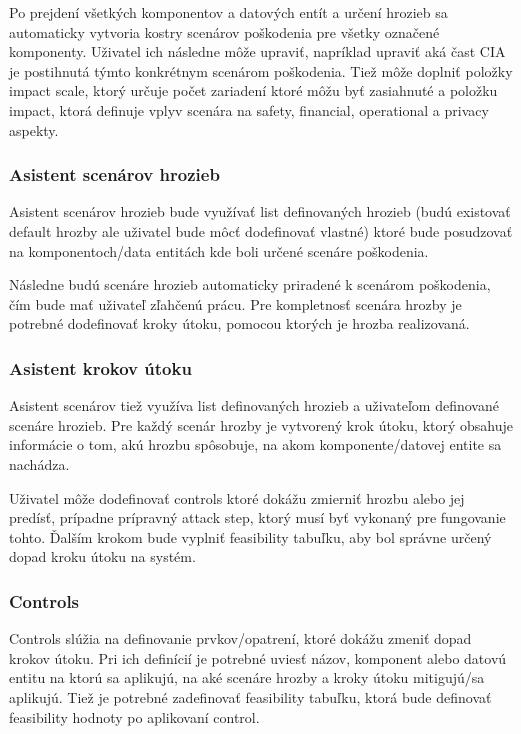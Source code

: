 \documentclass[11pt]{article}
\begin{document}
Po prejdení všetkých komponentov a datových entít a určení hrozieb sa automaticky vytvoria kostry scenárov poškodenia pre všetky označené komponenty.
Uživatel ich následne môže upraviť, napríklad upraviť aká čast CIA je postihnutá týmto konkrétnym scenárom poškodenia.
Tiež môže doplniť položky impact scale, ktorý určuje počet zariadení ktoré môžu byť zasiahnuté a položku impact, ktorá definuje vplyv scenára na safety, financial, operational a privacy aspekty.

\subsubsection{Asistent scenárov hrozieb}
Asistent scenárov hrozieb bude využívať list definovaných hrozieb (budú existovať default hrozby ale uživatel bude môcť dodefinovať vlastné) ktoré bude posudzovať na komponentoch/data entitách kde boli určené scenáre poškodenia.

Následne budú scenáre hrozieb automaticky priradené k scenárom poškodenia, čím bude mať uživateľ zľahčenú prácu.
Pre kompletnosť scenára hrozby je potrebné dodefinovať kroky útoku, pomocou ktorých je hrozba realizovaná.

\subsubsection{Asistent krokov útoku}
Asistent scenárov tiež využíva list definovaných hrozieb a uživateľom definované scenáre hrozieb.
Pre každý scenár hrozby je vytvorený krok útoku, ktorý obsahuje informácie o tom, akú hrozbu spôsobuje, na akom komponente/datovej entite sa nachádza.

Uživatel môže dodefinovať controls ktoré dokážu zmierniť hrozbu alebo jej predísť, prípadne prípravný attack step, ktorý musí byť vykonaný pre fungovanie tohto.
Ďalším krokom bude vyplniť feasibility tabuľku, aby bol správne určený dopad kroku útoku na systém.

\subsubsection{Controls}
Controls slúžia na definovanie prvkov/opatrení, ktoré dokážu zmeniť dopad krokov útoku.
Pri ich definícií je potrebné uviesť názov, komponent alebo datovú entitu na ktorú sa aplikujú, na aké scenáre hrozby a kroky útoku mitigujú/sa aplikujú.
Tiež je potrebné zadefinovať feasibility tabuľku, ktorá bude definovať feasibility hodnoty po aplikovaní control.
\end{document}
